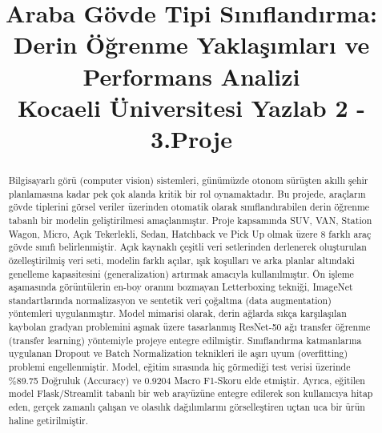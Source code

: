 \documentclass[conference]{IEEEtran}
\begin{document}
\title{Araba Gövde Tipi Sınıflandırma: Derin Öğrenme Yaklaşımları ve Performans Analizi\\
{\Large Kocaeli Üniversitesi Yazlab 2 - 3.Proje}
}

\author{
\and
{}
}

\maketitle

\begin{abstract}
Bilgisayarlı görü (computer vision) sistemleri, günümüzde otonom sürüşten akıllı şehir planlamasına kadar pek çok alanda kritik bir rol oynamaktadır. Bu projede, araçların gövde tiplerini görsel veriler üzerinden otomatik olarak sınıflandırabilen derin öğrenme tabanlı bir modelin geliştirilmesi amaçlanmıştır. Proje kapsamında SUV, VAN, Station Wagon, Micro, Açık Tekerlekli, Sedan, Hatchback ve Pick Up olmak üzere 8 farklı araç gövde sınıfı belirlenmiştir. Açık kaynaklı çeşitli veri setlerinden derlenerek oluşturulan özelleştirilmiş veri seti, modelin farklı açılar, ışık koşulları ve arka planlar altındaki genelleme kapasitesini (generalization) artırmak amacıyla kullanılmıştır. Ön işleme aşamasında görüntülerin en-boy oranını bozmayan Letterboxing tekniği, ImageNet standartlarında normalizasyon ve sentetik veri çoğaltma (data augmentation) yöntemleri uygulanmıştır. Model mimarisi olarak, derin ağlarda sıkça karşılaşılan kaybolan gradyan problemini aşmak üzere tasarlanmış ResNet-50 ağı transfer öğrenme (transfer learning) yöntemiyle projeye entegre edilmiştir. Sınıflandırma katmanlarına uygulanan Dropout ve Batch Normalization teknikleri ile aşırı uyum (overfitting) problemi engellenmiştir. Model, eğitim sırasında hiç görmediği test verisi üzerinde \%89.75 Doğruluk (Accuracy) ve 0.9204 Macro F1-Skoru elde etmiştir. Ayrıca, eğitilen model Flask/Streamlit tabanlı bir web arayüzüne entegre edilerek son kullanıcıya hitap eden, gerçek zamanlı çalışan ve olasılık dağılımlarını görselleştiren uçtan uca bir ürün haline getirilmiştir.
\end{abstract}
\end{document}
